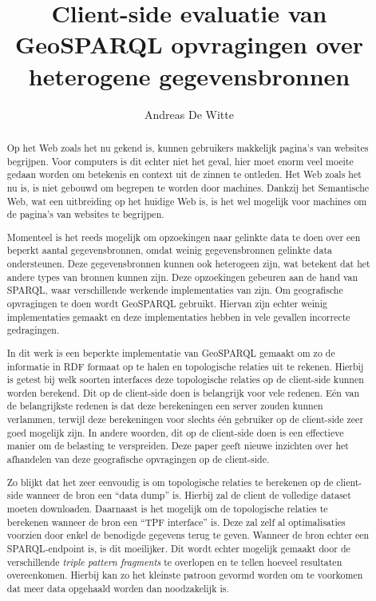 \documentclass[twocolumn]{phdsymp} %
\begin{document}
\title{Client-side evaluatie van GeoSPARQL opvragingen over heterogene gegevensbronnen} %

\author{Andreas De Witte}


\maketitle

\begin{abstract}
    Op het Web zoals het nu gekend is, kunnen gebruikers makkelijk pagina's van websites begrijpen. Voor computers is dit echter niet het geval, hier moet enorm veel moeite gedaan worden om betekenis en context uit de zinnen te ontleden. Het Web zoals het nu is, is niet gebouwd om begrepen te worden door machines. Dankzij het Semantische Web, wat een uitbreiding op het huidige Web is, is het wel mogelijk voor machines om de pagina's van websites te begrijpen.
    
    Momenteel is het reeds mogelijk om opzoekingen naar gelinkte data te doen over een beperkt aantal gegevensbronnen, omdat weinig gegevensbronnen gelinkte data ondersteunen. Deze gegevensbronnen kunnen ook heterogeen zijn, wat betekent dat het andere types van bronnen kunnen zijn. Deze opzoekingen gebeuren aan de hand van SPARQL, waar verschillende werkende implementaties van zijn. Om geografische opvragingen te doen wordt GeoSPARQL gebruikt. Hiervan zijn echter weinig implementaties gemaakt en deze implementaties hebben in vele gevallen incorrecte gedragingen.
    
    In dit werk is een beperkte implementatie van GeoSPARQL gemaakt om zo de informatie in RDF formaat op te halen en topologische relaties uit te rekenen. Hierbij is getest bij welk soorten interfaces deze topologische relaties op de client-side kunnen worden berekend. Dit op de client-side doen is belangrijk voor vele redenen. Eén van de belangrijkste redenen is dat deze berekeningen een server zouden kunnen verlammen, terwijl deze berekeningen voor slechts één gebruiker op de client-side zeer goed mogelijk zijn. In andere woorden, dit op de client-side doen is een effectieve manier om de belasting te verspreiden. Deze paper geeft nieuwe inzichten over het afhandelen van deze geografische opvragingen op de client-side.

    Zo blijkt dat het zeer eenvoudig is om topologische relaties te berekenen op de client-side wanneer de bron een ``data dump'' is. Hierbij zal de client de volledige dataset moeten downloaden. Daarnaast is het mogelijk om de topologische relaties te berekenen wanneer de bron een ``TPF interface'' is. Deze zal zelf al optimalisaties voorzien door enkel de benodigde gegevens terug te geven. Wanneer de bron echter een SPARQL-endpoint is, is dit moeilijker. Dit wordt echter mogelijk gemaakt door de verschillende \textit{triple pattern fragments} te overlopen en te tellen hoeveel resultaten overeenkomen. Hierbij kan zo het kleinste patroon gevormd worden om te voorkomen dat meer data opgehaald worden dan noodzakelijk is.
    

\end{abstract}
\end{document}
